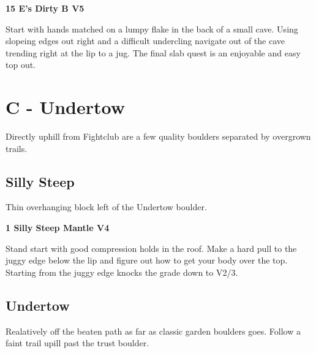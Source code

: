 \begin{multicols}{2}

					\label{rt:E's Dirty B}
\colorbox{RoyalBlue!20}{
\parbox{0.95\linewidth}{
\textbf{
15 E's Dirty B V5    
}
}
}

					\begin{adjustwidth}{0.5cm}{}				
					Start with hands matched on a lumpy flake in the back of a small cave. Using slopeing edges out right and a difficult undercling navigate out of the cave trending right at the lip to a jug. The final slab quest is an enjoyable and easy top out.
					\end{adjustwidth}
\newpage

		\section{C - Undertow}\label{sa:Undertow}
	Directly uphill from Fightclub are a few quality boulders separated by overgrown trails.\\

	
			\subsection*{Silly Steep}\label{bf:Silly Steep}
			Thin overhanging block left of the Undertow boulder.\\
			
					\label{rt:Silly Steep Mantle}
\colorbox{RoyalBlue!20}{
\parbox{0.95\linewidth}{
\textbf{
1 Silly Steep Mantle V4    
}
}
}

					\begin{adjustwidth}{0.5cm}{}				
					Stand start with good compression holds in the roof. Make a hard pull to the juggy edge below the lip and figure out how to get your body over the top. Starting from the juggy edge knocks the grade down to V2/3.
					\end{adjustwidth}

			\subsection*{Undertow}\label{bf:Undertow}
			Realatively off the beaten path as far as classic garden boulders goes. Follow a faint trail upill past the trust boulder.\\
			


\end{multicols}
